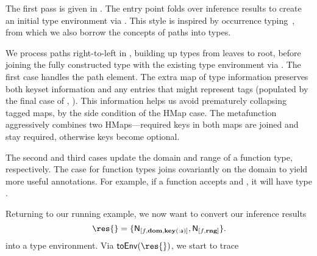 
The first pass is given in .
The entry point \generatetenv{} folds over inference results
to create an initial type environment via \inferupdateOp{}.
This style is inspired by occurrence typing~\cite{TF10},
from which we also borrow the concepts of paths into types.

We process paths right-to-left in \inferupdateOp{}, building
up types from leaves to root, before joining the fully constructed type with the existing
type environment via \joinOp{}.
The first case handles the \keypeOp{} path element.
The extra map of type information preserves both keyset
information and any entries that might represent tags
(populated by the final case of \trackEOp{}, ).
This information helps us avoid prematurely collapsing tagged maps,
by the side condition of the HMap \joinOp{} case.
The \joinHMapOp{} metafunction aggressively combines two HMaps---required
keys in both maps are joined and stay required, otherwise keys
become optional.

The second and third \inferupdateOp{} cases update the domain and range of a function type,
respectively.
The \joinOp{} case for function types joins covariantly on the domain to yield more useful
annotations. For example, if a function accepts \IntT{} and \Keyword{},
it will have type
\joinnoalign{\arrow{\IntT{}}{\UnknownT{}}}{\arrow{\Keyword{}}{\UnknownT{}}}
{\arrow{\Union{\IntT{}}{\Keyword{}}}{\UnknownT{}}}.

Returning to our running example, we now want to convert our inference results
$$
\res{} = \{\resentry{[f, \dompe{}, \inferkeypenokeyset{[\makekw{a}]}{\makekw{a}}]}{\IntT{}}, \resentry{[f, \rngpe{}]}{\IntT{}}\}.
$$
into a type environment. Via $\generatetenv{}(\res{})$, we start to trace


